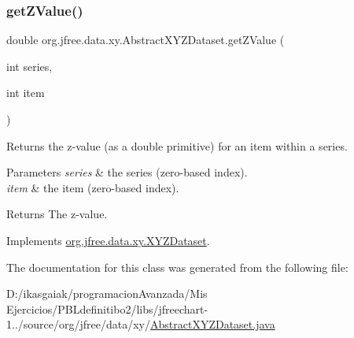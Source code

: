 \subsubsection{\texorpdfstring{get\+Z\+Value()}{getZValue()}}
{\footnotesize\ttfamily double org.\+jfree.\+data.\+xy.\+Abstract\+X\+Y\+Z\+Dataset.\+get\+Z\+Value (\begin{DoxyParamCaption}\item[{int}]{series,  }\item[{int}]{item }\end{DoxyParamCaption})}

Returns the z-\/value (as a double primitive) for an item within a series.


\begin{DoxyParams}{Parameters}
{\em series} & the series (zero-\/based index). \\
\hline
{\em item} & the item (zero-\/based index).\\
\hline
\end{DoxyParams}
\begin{DoxyReturn}{Returns}
The z-\/value. 
\end{DoxyReturn}


Implements \mbox{\hyperlink{interfaceorg_1_1jfree_1_1data_1_1xy_1_1_x_y_z_dataset_a2aed0d6b0bbf979643691fc932efa2bc}{org.\+jfree.\+data.\+xy.\+X\+Y\+Z\+Dataset}}.



The documentation for this class was generated from the following file\+:\begin{DoxyCompactItemize}
\item 
D\+:/ikasgaiak/programacion\+Avanzada/\+Mis Ejercicios/\+P\+B\+Ldefinitibo2/libs/jfreechart-\/1../source/org/jfree/data/xy/\mbox{\hyperlink{_abstract_x_y_z_dataset_8java}{Abstract\+X\+Y\+Z\+Dataset.\+java}}\end{DoxyCompactItemize}

